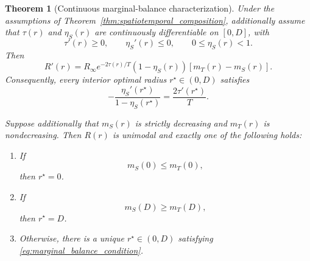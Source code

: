 \documentclass[11pt]{article}
\newtheorem{theorem}{Theorem}
\begin{document}
\begin{theorem}[Continuous marginal-balance characterization]
\label{thm:marginal_balance}
Under the assumptions of
Theorem~\ref{thm:spatiotemporal_composition}, additionally assume that
$\tau(r)$ and $\eta_S(r)$ are continuously differentiable on $[0,D]$, with
\[
    \tau'(r)\ge0,
    \qquad
    \eta_S'(r)\le0,
    \qquad
    0\le\eta_S(r)<1.
\]
Then
\begin{equation}
    R'(r)
    =
    R_\infty
    e^{-2\tau(r)/T}
    \left(
        1-\eta_S(r)
    \right)
    \left[
        m_T(r)-m_S(r)
    \right].
    \label{eq:R_derivative_marginal}
\end{equation}
Consequently, every interior optimal radius $r^\star\in(0,D)$ satisfies
\begin{equation}
    \boxed{
    -\frac{
        \eta_S'(r^\star)
    }{
        1-\eta_S(r^\star)
    }
    =
    \frac{
        2\tau'(r^\star)
    }{
        T
    }.
    }
    \label{eq:marginal_balance_condition}
\end{equation}

Suppose additionally that $m_S(r)$ is strictly decreasing and $m_T(r)$ is
nondecreasing. Then $R(r)$ is unimodal and exactly one of the following holds:

\begin{enumerate}
    \item If
    \begin{equation}
        m_S(0)
        \le
        m_T(0),
        \label{eq:local_boundary_condition}
    \end{equation}
    then $r^\star=0$.

    \item If
    \begin{equation}
        m_S(D)
        \ge
        m_T(D),
        \label{eq:global_boundary_condition}
    \end{equation}
    then $r^\star=D$.

    \item Otherwise, there is a unique
    $r^\star\in(0,D)$ satisfying
    \eqref{eq:marginal_balance_condition}.
\end{enumerate}
\end{theorem}
\end{document}
